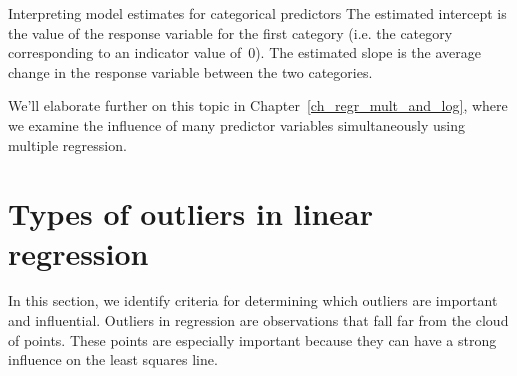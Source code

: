 \begin{onebox}{Interpreting model estimates for
    categorical predictors}
  The estimated intercept is the value of the response variable
  for the first category (i.e. the category corresponding to an
  indicator value of~0).
  The estimated slope is the average change in the response
  variable between the two categories.
\end{onebox}

We'll elaborate further on this topic in
Chapter~\ref{ch_regr_mult_and_log},
where we examine the influence of many
predictor variables simultaneously using
multiple regression.


{}








\section{Types of outliers in linear regression}
\label{typesOfOutliersInLinearRegression}

In this section, we identify criteria for determining which
outliers are important and influential.
Outliers in regression are observations that fall far from
the cloud of points.
These points are especially important because they can have
a strong influence on the least squares line. 


